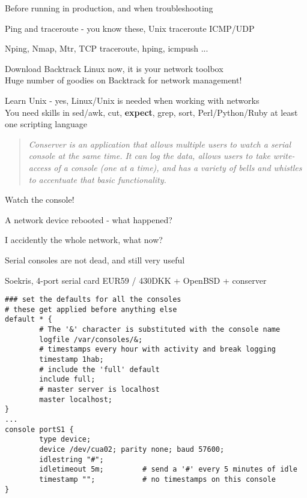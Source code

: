 \documentclass[28pt,landscape,a4paper,footrule]{foils}
\begin{document}

\begin{slidelist}
\item Before running in production, and when troubleshooting
\item Ping and traceroute - you know these, Unix traceroute ICMP/UDP
\item Nping, Nmap, Mtr, TCP traceroute, hping, icmpush ...
\item Download Backtrack Linux now, it is your network toolbox\\
Huge number of goodies on Backtrack for network management!\\
\item Learn Unix - yes, Linux/Unix is needed when working with networks\\
You need skills in sed/awk, cut, {\bf expect}, grep, sort, Perl/Python/Ruby at least one scripting language  
\end{slidelist}


\begin{quote}
\it Conserver is an application that allows multiple users to watch a serial console at the same time. It can log the data, allows users to take write-access of a console (one at a time), and has a variety of bells and whistles to accentuate that basic functionality. 
\end{quote}

\begin{slidelist}
\item Watch the console!
\item A network device rebooted - what happened?
\item I accidently the whole network, what now?
\item Serial consoles are not dead, and still very useful
\item {}
\end{slidelist}



\centerline{Soekris, 4-port serial card EUR59 / 430DKK + OpenBSD + conserver}

\footnotesize
\begin{verbatim}
### set the defaults for all the consoles
# these get applied before anything else
default * {
        # The '&' character is substituted with the console name
        logfile /var/consoles/&;
        # timestamps every hour with activity and break logging
        timestamp 1hab;
        # include the 'full' default
        include full;
        # master server is localhost
        master localhost;
}
...
console portS1 {
        type device;
        device /dev/cua02; parity none; baud 57600;
        idlestring "#";
        idletimeout 5m;         # send a '#' every 5 minutes of idle
        timestamp "";           # no timestamps on this console
}
\end{verbatim}
\normalsize
\end{document}
